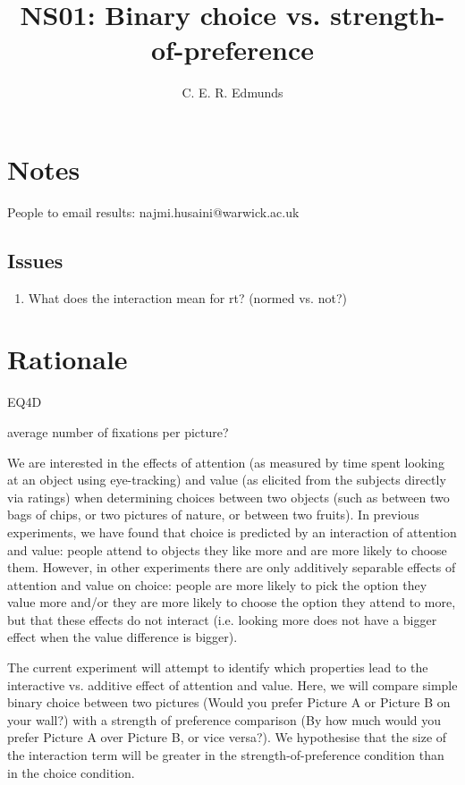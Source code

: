 \documentclass[12pt]{article}
\title{NS01: Binary choice vs. strength-of-preference}
\author{C. E. R. Edmunds}
\date{}
\begin{document}
\maketitle

\doublespacing

\section{Notes}
People to email results: najmi.husaini@warwick.ac.uk

\subsection{Issues}
\begin{enumerate}
	\item What does the interaction mean for rt? (normed vs. not?)
\end{enumerate}

\section{Rationale}

EQ4D

average number of fixations per picture?

We are interested in the effects of attention (as measured by time spent looking at an object using eye-tracking) and value (as elicited from the subjects directly via ratings) when determining choices between two objects (such as between two bags of chips, or two pictures of nature, or between two fruits). In previous experiments, we have found that choice is predicted by an interaction of attention and value: people attend to objects they like more and are more likely to choose them. However, in other experiments there are only additively separable effects of attention and value on choice: people are more likely to pick the option they value more and/or they are more likely to choose the option they attend to more, but that these effects do not interact (i.e. looking more does not have a bigger effect when the value difference is bigger). 
 
The current experiment will attempt to identify which properties lead to the interactive vs. additive effect of attention and value. Here, we will compare simple binary choice between two pictures (Would you prefer Picture A or Picture B on your wall?) with a strength of preference comparison (By how much would you prefer Picture A over Picture B, or vice versa?). We hypothesise that the size of the interaction term will be greater in the strength-of-preference condition than in the choice condition. 
\end{document}
